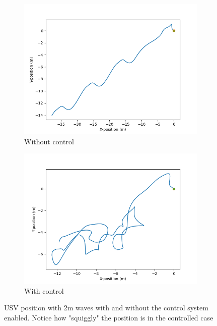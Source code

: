 \documentclass[class=article, crop=false]{standalone}
\begin{document}
\begin{figure}
    \centering
    \begin{subfigure}{0.45\textwidth}
        \centering
        \includegraphics{scenario1/rov-50m/2.0m/usv_position_uncontrolled}
        \caption{Without control}
    \end{subfigure}
    \hfill
    \begin{subfigure}{0.45\textwidth}
        \centering
        \includegraphics{scenario1/rov-50m/2.0m/usv_position_controlled}
        \caption{With control}
    \end{subfigure}
    \caption{USV position with 2m waves with and without the control system enabled. Notice how "squiggly" the position is in the controlled case}
    \label{fig:fucked_position}
\end{figure}
\end{document}
